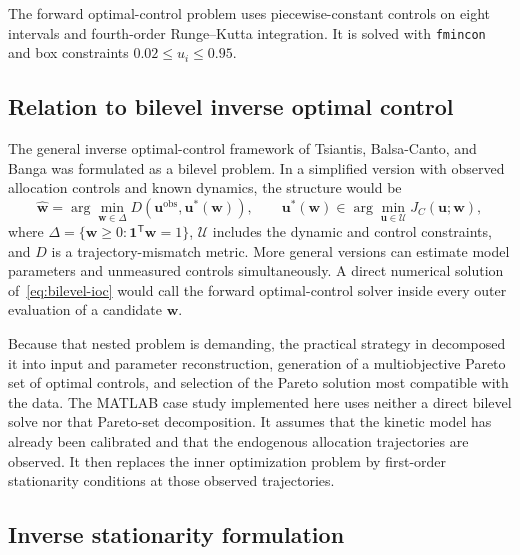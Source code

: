 \documentclass[11pt,a4paper]{article}
\newcommand{\vect}[1]{\boldsymbol{#1}}
\begin{document}
The forward optimal-control problem uses piecewise-constant controls on eight
intervals and fourth-order Runge--Kutta integration. It is solved with
\texttt{fmincon} and box constraints \(0.02\le u_i\le0.95\).

\subsection{Relation to bilevel inverse optimal control}

The general inverse optimal-control framework of Tsiantis, Balsa-Canto, and
Banga \cite{Tsiantis2018} was formulated as a bilevel problem. In a simplified
version with observed allocation controls and known dynamics, the structure
would be
\begin{equation}
  \hat{\vect{w}}
  =
  \arg\min_{\vect{w}\in\Delta}
  D\!\left(\vect{u}^{\mathrm{obs}},\vect{u}^{*}(\vect{w})\right),
  \qquad
  \vect{u}^{*}(\vect{w})
  \in
  \arg\min_{\vect{u}\in\mathcal{U}}
  J_C(\vect{u};\vect{w}),
  \label{eq:bilevel-ioc}
\end{equation}
where \(\Delta=\{\vect{w}\ge0:\vect{1}^{\mathsf T}\vect{w}=1\}\),
\(\mathcal{U}\) includes the dynamic and control constraints, and \(D\) is a
trajectory-mismatch metric. More general versions can estimate model
parameters and unmeasured controls simultaneously. A direct numerical
solution of~\eqref{eq:bilevel-ioc} would call the forward optimal-control
solver inside every outer evaluation of a candidate \(\vect{w}\).

Because that nested problem is demanding, the practical strategy in
\cite{Tsiantis2018} decomposed it into input and parameter reconstruction,
generation of a multiobjective Pareto set of optimal controls, and selection
of the Pareto solution most compatible with the data. The MATLAB case study
implemented here uses neither a direct bilevel solve nor that Pareto-set
decomposition. It assumes that the kinetic model has already been calibrated
and that the endogenous allocation trajectories are observed. It then replaces
the inner optimization problem by first-order stationarity conditions at those
observed trajectories.

\subsection{Inverse stationarity formulation}
\end{document}
